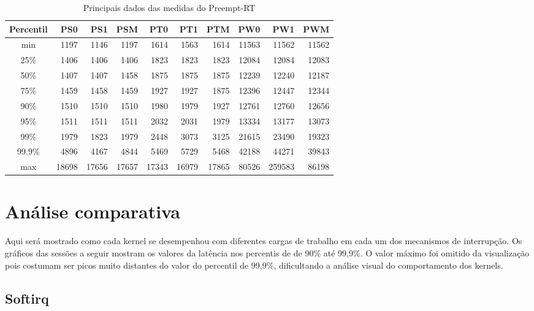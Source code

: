 \begin{table}[!htb]
\centering
\begin{center}
\begin{tabular}{|c||r|r|r|r|r|r|r|r|r|}
\toprule
Percentil &    PS0 &    PS1 &    PSM &    PT0 &    PT1 &    PTM &    PW0 &     PW1 &    PWM \\
\midrule
    min &   1197 &   1146 &   1197 &   1614 &   1563 &   1614 &  11563 &   11562 &  11562 \\
    25\% &   1406 &   1406 &   1406 &   1823 &   1823 &   1823 &  12084 &   12084 &  12083 \\
    50\% &   1407 &   1407 &   1458 &   1875 &   1875 &   1875 &  12239 &   12240 &  12187 \\
    75\% &   1459 &   1458 &   1459 &   1927 &   1927 &   1875 &  12396 &   12447 &  12344 \\
    90\% &   1510 &   1510 &   1510 &   1980 &   1979 &   1927 &  12761 &   12760 &  12656 \\
    95\% &   1511 &   1511 &   1511 &   2032 &   2031 &   1979 &  13334 &   13177 &  13073 \\
    99\% &   1979 &   1823 &   1979 &   2448 &   3073 &   3125 &  21615 &   23490 &  19323 \\
    99.9\% &   4896 &   4167 &   4844 &   5469 &   5729 &   5468 &  42188 &   44271 &  39843 \\
    max &  18698 &  17656 &  17657 &  17343 &  16979 &  17865 &  80526 &  259583 &  86198 \\
\bottomrule
\end{tabular}
\end{center}
\caption{Principais dados das medidas do Preempt-RT}
\label{table:prt}
\end{table}

\section{Análise comparativa}

Aqui será mostrado como cada kernel se desempenhou com diferentes cargas de trabalho em cada um dos mecanismos de interrupção. Os gráficos das sessões a seguir mostram os valores da latência nos percentis de de 90\% até 99,9\%. O valor máximo foi omitido da visualização pois costumam ser picos muito distantes do valor do percentil de 99,9\%, dificultando a análise visual do comportamento dos kernels.


\subsection{Softirq}

